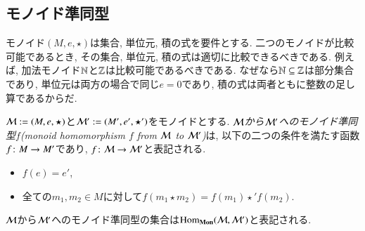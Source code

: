 
\subsection{モノイド準同型}


モノイド$(M,e,\star)$は集合, 単位元, 積の式を要件とする. 二つのモノイドが比較可能であるとき, その集合, 単位元, 積の式は適切に比較できるべきである. 例えば, 加法モノイド${\mathbb N}$と${\mathbb Z}$は比較可能であるべきである. なぜなら${\mathbb N}\subseteq{\mathbb Z}$は部分集合であり, 単位元は両方の場合で同じ$e=0$であり, 積の式は両者ともに整数の足し算であるからだ.

\begin{definition}\label{def:monoid hom}


$\mathcal{M}:=(M,e,\star)$と$\mathcal{M}':=(M',e',\star')$をモノイドとする. \emph{$\mathcal{M}$から$\mathcal{M}'$へのモノイド準同型$f$(monoid homomorphism $f$ from $\mathcal{M}$ to $\mathcal{M}'$)}は, 以下の二つの条件を満たす函数$f\colon M\rightarrow M'$であり, $f\colon\mathcal{M}\rightarrow\mathcal{M}'$と表記される.
\begin{itemize}
\item $f(e)=e'$,
\item 全ての$m_1,m_2\in M$に対して$f(m_1\star m_2)=f(m_1)\star'f(m_2)$.
\end{itemize}


$\mathcal{M}$から$\mathcal{M}'$へのモノイド準同型の集合は$\Hom_{\Mon}(\mcM,\mcM')$と表記される.

\end{definition}

